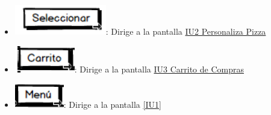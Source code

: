 		\begin{itemize}

			\item \includegraphics[scale=0.500]{imagenes/iconografia/Seleccionar.png}: Dirige a la pantalla \hyperlink{IU2}{IU2 Personaliza Pizza}
			\item \includegraphics[scale=0.500]{imagenes/iconografia/Carrito.png}: Dirige a la pantalla \hyperlink{IU3}{IU3 Carrito de Compras}
			\item \includegraphics[scale=0.500]{imagenes/iconografia/Menu.png}: Dirige a la pantalla \ref{IU1}

		\end{itemize}


